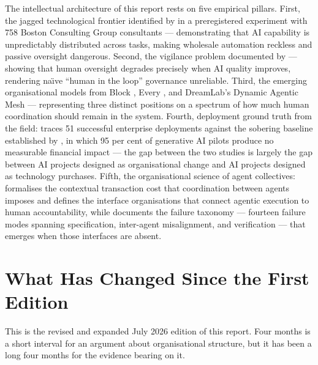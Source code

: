 The intellectual architecture of this report rests on five empirical pillars. First, the jagged technological frontier identified by \textcite{DellAcqua2026} in a preregistered experiment with 758 Boston Consulting Group consultants --- demonstrating that AI capability is unpredictably distributed across tasks, making wholesale automation reckless and passive oversight dangerous. Second, the vigilance problem documented by \textcite{DellAcqua2023} --- showing that human oversight degrades precisely when AI quality improves, rendering na\"{\i}ve ``human in the loop'' governance unreliable. Third, the emerging organisational models from Block \parencite{DorseyBotha2026}, Every \parencite{Shipper2026}, and DreamLab's Dynamic Agentic Mesh --- representing three distinct positions on a spectrum of how much human coordination should remain in the system. Fourth, deployment ground truth from the field: \textcite{Pereira2026Playbook} traces 51 successful enterprise deployments against the sobering baseline established by \textcite{MITNANDA2025}, in which 95 per cent of generative AI pilots produce no measurable financial impact --- the gap between the two studies is largely the gap between AI projects designed as organisational change and AI projects designed as technology purchases. Fifth, the organisational science of agent collectives: \textcite{Liu2026} formalises the contextual transaction cost that coordination between agents imposes and defines the interface organisations that connect agentic execution to human accountability, while \textcite{Cemri2025} documents the failure taxonomy --- fourteen failure modes spanning specification, inter-agent misalignment, and verification --- that emerges when those interfaces are absent.

\section{What Has Changed Since the First Edition}

This is the revised and expanded July 2026 edition of this report. Four months is a short interval for an argument about organisational structure, but it has been a long four months for the evidence bearing on it.

